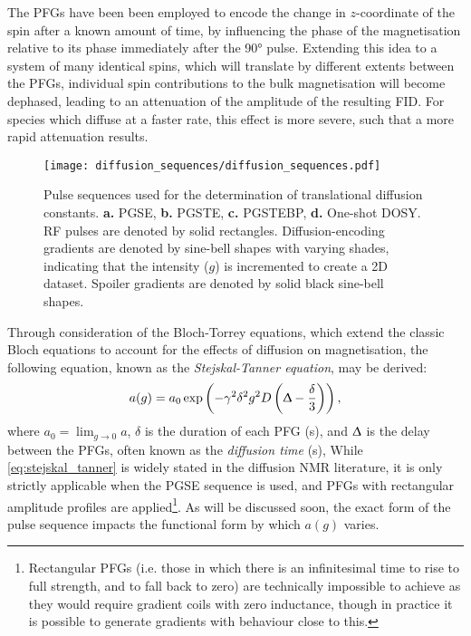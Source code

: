The \acp{PFG} have been been employed to encode the change in
$z$-coordinate of the spin after a known amount of time, by influencing the
phase of the magnetisation relative to its phase immediately after the \ang{90}
pulse.
Extending this idea to a system of many identical spins, which will translate
by different extents between the \acp{PFG}, individual spin contributions to
the bulk magnetisation will become dephased, leading to an attenuation of the
amplitude of the resulting \ac{FID}. For species which diffuse at a faster
rate, this effect is more severe, such that a more rapid attenuation results.

\begin{figure}
   \texttt{[image: diffusion\_sequences/diffusion\_sequences.pdf]}
   \caption[
       Pulse sequences used for the determination of translational diffusion constants.
   ]{
       Pulse sequences used for the determination of translational diffusion constants.
       \textbf{a.} \acs{PGSE},
       \textbf{b.} \acs{PGSTE},
       \textbf{c.} \acs{PGSTEBP},
       \textbf{d.} One-shot DOSY.
       \ac{RF} pulses are denoted by solid rectangles. Diffusion-encoding
       gradients are denoted by sine-bell shapes with varying shades,
       indicating that the intensity ($g$) is incremented to create a \ac{2D}
       dataset. Spoiler gradients are denoted by solid black sine-bell shapes.
   }
   \label{fig:diffusion_sequences}
\end{figure}

Through consideration of the Bloch-Torrey equations\cite{Torrey1956}, which
extend the classic Bloch equations to account for the effects of diffusion on
magnetisation, the following equation, known as the \emph{Stejskal-Tanner
equation}, may be derived:
\begin{equation}
    a(g) = a_0 \exp \left(- \gamma^2 \delta^2 g^2 D \left(\Updelta -
    \frac{\delta}{3}\right)\right),
    \label{eq:stejskal_tanner}
\end{equation}
where
$a_0 = \lim_{g \rightarrow 0} a$,
$\delta$ is the duration of each \ac{PFG} (\unit{\second}), and
$\Updelta$ is the delay between the \acp{PFG}, often known as the \emph{diffusion time}
(\unit{\second}),
While \cref{eq:stejskal_tanner} is widely stated in the diffusion \ac{NMR}
literature, it is only strictly applicable when the \ac{PGSE} sequence is used,
and \acp{PFG} with rectangular amplitude profiles are applied\footnote{
    Rectangular \acp{PFG} (i.e. those in which there is an infinitesimal time
    to rise to full strength, and to fall back to zero) are technically
    impossible to achieve as they would require gradient coils with zero
    inductance, though in practice it is possible to generate gradients with
    behaviour close to this.
}. As will be discussed soon, the exact form of the pulse sequence impacts the
functional form by which $a(g)$ varies.

